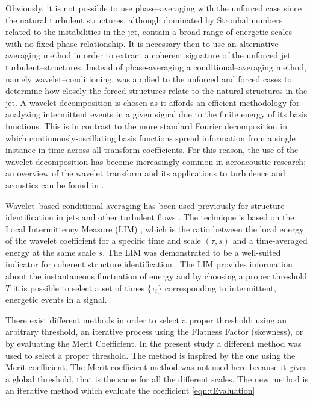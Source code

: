 Obviously, it is not possible to use phase--averaging with the unforced case since the natural turbulent structures, although dominated by Strouhal numbers related to the instabilities in the jet, contain a broad range of energetic scales with no fixed phase relationship. 
It is necessary then to use an alternative averaging method in order to extract a coherent signature of the unforced jet turbulent--structures.
Instead of phase-averaging a conditional--averaging method, namely wavelet--conditioning, was applied to the unforced and forced cases to determine how closely the forced structures relate to the natural structures in the jet.
A wavelet decomposition is chosen as it affords an efficient methodology for analyzing intermittent events in a given signal due to the finite energy of its basis functions.
This is in contrast to the more standard Fourier decomposition in which continuously-oscillating basis functions spread information from a single instance in time across all transform coefficients.
For this reason, the use of the wavelet decomposition has become increasingly common in aeroacoustic research; an overview of the wavelet transform and its applications to turbulence and acoustics can be found in \citet{Farge1992}.

Wavelet--based conditional averaging has been used previously for structure identification in jets and other turbulent flows \citep{Camussi1997,Camussi1997b,Guj1999,Camussi2002,Guj2003}.
The technique is based on the Local Intermittency Measure (LIM) \citep{Farge1992}, which is the ratio between the local energy of the wavelet coefficient for a specific time and scale $(\tau, s)$ and a time-averaged energy at the same scale $s$.
The LIM was demonstrated to be a well-suited indicator for coherent structure identification \citep{Camussi1997}. 
The LIM provides information about the instantaneous fluctuation of energy and by choosing a proper threshold $T$ it is possible to select a set of times $\{\tau_{i}\}$ corresponding to intermittent, energetic events in a signal.

There exist different methods in order to select a proper threshold: using an arbitrary threshold, an iterative process using the Flatness Factor (skewness), or by evaluating the Merit Coefficient. In the present study a different method was used to select a proper threshold. The method is inspired by the one using the Merit coefficient. The Merit coefficient method was not used here because it gives a global threshold, that is the same for all the different scales. The new method is an iterative method which evaluate the coefficient \ref{eqn:tEvaluation}

